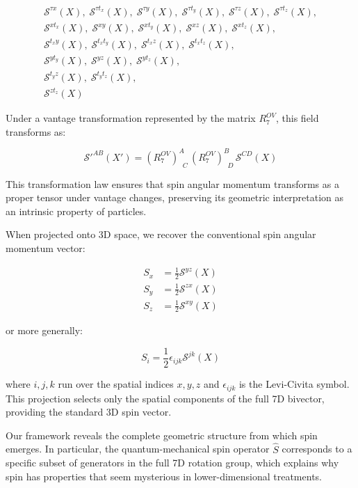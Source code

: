 \documentclass{article}
\begin{document}
\begin{align}
\mathcal{S}^{\tau x}(X),\; \mathcal{S}^{\tau t_x}(X),\; \mathcal{S}^{\tau y}(X),\; \mathcal{S}^{\tau t_y}(X),\; \mathcal{S}^{\tau z}(X),\; \mathcal{S}^{\tau t_z}(X),\\
\mathcal{S}^{x t_x}(X),\; \mathcal{S}^{xy}(X),\; \mathcal{S}^{x t_y}(X),\; \mathcal{S}^{xz}(X),\; \mathcal{S}^{x t_z}(X),\\
\mathcal{S}^{t_x y}(X),\; \mathcal{S}^{t_x t_y}(X),\; \mathcal{S}^{t_x z}(X),\; \mathcal{S}^{t_x t_z}(X),\\
\mathcal{S}^{y t_y}(X),\; \mathcal{S}^{yz}(X),\; \mathcal{S}^{y t_z}(X),\\
\mathcal{S}^{t_y z}(X),\; \mathcal{S}^{t_y t_z}(X),\\
\mathcal{S}^{z t_z}(X)
\end{align}

Under a vantage transformation represented by the matrix $R^{OV}_7$, this field transforms as:

\begin{equation}
\mathcal{S}'^{AB}(X') = (R^{OV}_7)^A_{\;\;C} \, (R^{OV}_7)^B_{\;\;D} \, \mathcal{S}^{CD}(X)
\end{equation}

This transformation law ensures that spin angular momentum transforms as a proper tensor under vantage changes, preserving its geometric interpretation as an intrinsic property of particles.

When projected onto 3D space, we recover the conventional spin angular momentum vector:

\begin{align}
S_x &= \frac{1}{2}\mathcal{S}^{yz}(X) \\
S_y &= \frac{1}{2}\mathcal{S}^{zx}(X) \\
S_z &= \frac{1}{2}\mathcal{S}^{xy}(X)
\end{align}

or more generally:

\begin{equation}
S_i = \frac{1}{2}\epsilon_{ijk}\mathcal{S}^{jk}(X)
\end{equation}

where $i,j,k$ run over the spatial indices $x,y,z$ and $\epsilon_{ijk}$ is the Levi-Civita symbol. This projection selects only the spatial components of the full 7D bivector, providing the standard 3D spin vector.

Our framework reveals the complete geometric structure from which spin emerges. In particular, the quantum-mechanical spin operator $\hat{S}$ corresponds to a specific subset of generators in the full 7D rotation group, which explains why spin has properties that seem mysterious in lower-dimensional treatments.
\end{document}
